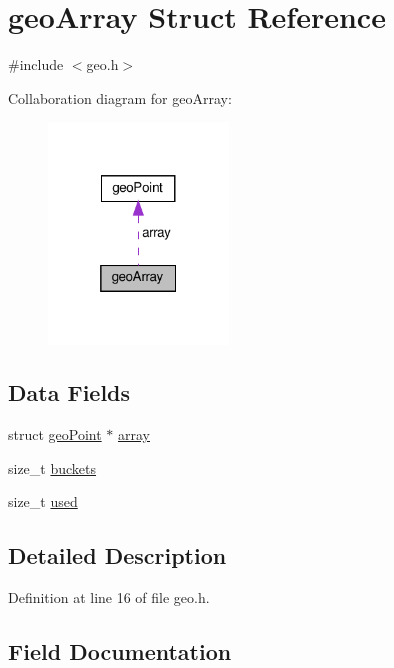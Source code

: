 \hypertarget{structgeo_array}{}\section{geo\+Array Struct Reference}
\label{structgeo_array}


{\ttfamily \#include $<$geo.\+h$>$}



Collaboration diagram for geo\+Array\+:
\nopagebreak
\begin{figure}[H]
\begin{center}
\leavevmode
\includegraphics[width=136pt]{structgeo_array__coll__graph}
\end{center}
\end{figure}
\subsection*{Data Fields}
\begin{DoxyCompactItemize}
\item 
struct \hyperlink{structgeo_point}{geo\+Point} $\ast$ \hyperlink{structgeo_array_a4a1c0417f521d45e91edb7052f322bc7}{array}
\item 
size\+\_\+t \hyperlink{structgeo_array_af69e9b05b4318b72a5be55082b78fb58}{buckets}
\item 
size\+\_\+t \hyperlink{structgeo_array_ae8cc011bf3ee2d3c19743095ffc0f7a5}{used}
\end{DoxyCompactItemize}


\subsection{Detailed Description}


Definition at line 16 of file geo.\+h.



\subsection{Field Documentation}
\mbox{\label{structgeo_array_a4a1c0417f521d45e91edb7052f322bc7}} 

